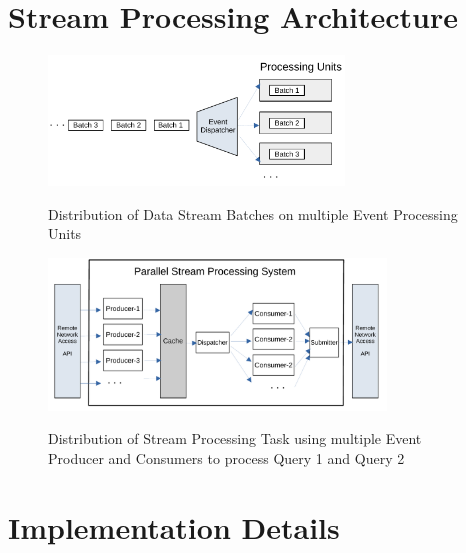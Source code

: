 \section{Stream Processing Architecture}\label{sec:concepts}

\begin{figure}[!h]
    \begin{center}
        \includegraphics[width=0.7\textwidth]{./images/Stream-Batch-Distributions}
        \label{fig:batch-distributions}
        \caption{Distribution of Data Stream Batches on  multiple Event Processing Units}
    \end{center}
\end{figure}




\begin{figure}[!ht]
    \begin{center}
        \includegraphics[width=0.8\textwidth]{./images/Parallel-Stream-Processing-System}
        \label{fig:parallel-srream-processing}
        \caption{Distribution of Stream Processing Task using multiple Event Producer and Consumers to process Query 1 and Query 2 }
    \end{center}
\end{figure}



\section{Implementation Details}\label{sec:implementation}



